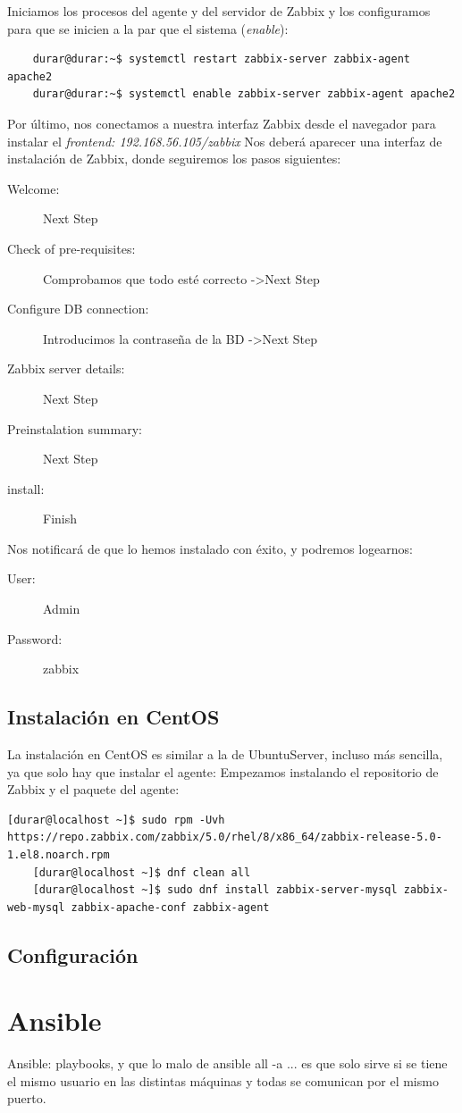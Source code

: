 \documentclass[a4paper]{article}
\begin{document}
Iniciamos los procesos del agente y del servidor de Zabbix y los configuramos
 para que se inicien a la par que el sistema (\textsl{enable}):\newpage
\begin{lstlisting}
    durar@durar:~$ systemctl restart zabbix-server zabbix-agent apache2
    durar@durar:~$ systemctl enable zabbix-server zabbix-agent apache2
\end{lstlisting}
Por último, nos conectamos a nuestra interfaz Zabbix desde el navegador para
instalar el \textsl{frontend: 192.168.56.105/zabbix} \newline
Nos deberá aparecer una interfaz de instalación de Zabbix, donde seguiremos los pasos siguientes:
\begin{description}
    \item[Welcome:] Next Step 
    \item[Check of pre-requisites:] Comprobamos que todo esté correcto -\textgreater Next Step
    \item[Configure DB connection:] Introducimos la contraseña de la BD -\textgreater Next Step   
    \item[Zabbix server details:] Next Step
    \item[Preinstalation summary:] Next Step
    \item[install:] Finish   
\end{description}
Nos notificará de que lo hemos instalado con éxito, y podremos logearnos:
\begin{description}
    \item[User:] Admin
    \item[Password:] zabbix  
\end{description}
\subsection*{Instalación en CentOS}
La instalación en CentOS es similar a la de UbuntuServer, incluso más sencilla, ya que
solo hay que instalar el agente:
Empezamos instalando el repositorio de Zabbix y el paquete del agente:
\begin{lstlisting}[style=bashCentOS]
    [durar@localhost ~]$ sudo rpm -Uvh https://repo.zabbix.com/zabbix/5.0/rhel/8/x86_64/zabbix-release-5.0-1.el8.noarch.rpm
    [durar@localhost ~]$ dnf clean all
    [durar@localhost ~]$ sudo dnf install zabbix-server-mysql zabbix-web-mysql zabbix-apache-conf zabbix-agent
\end{lstlisting}

\subsection{Configuración}

\section{Ansible}
Ansible: playbooks, y que lo malo de ansible all -a ... es que solo sirve si se tiene 
el mismo usuario en las distintas máquinas y todas se comunican por el mismo puerto.
\end{document}
